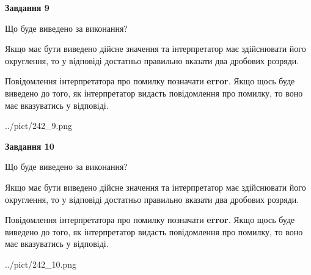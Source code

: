 \documentclass[12pt, ukrainian]{article}
\begin{document}
{\begin {Large}
{\begin {center}\textbf{Завдання 9}\end {center}}\par
Що буде виведено за виконання? \par

Якщо має бути виведено дійсне значення та інтерпретатор має здійснювати його округлення, 
то у відповіді достатньо правильно вказати два дробових розряди.

Повідомлення інтерпретатора про помилку позначати \textbf{error}.
Якщо щось буде виведено до того, як інтерпретатор видасть повідомлення про помилку, 
то воно має вказуватись у відповіді. \par

\begin{center}
	{../pict/242_9.png}
\end{center}
\newpage

{\begin {center}\textbf{Завдання 10}\end {center}}\par
Що буде виведено за виконання? \par

Якщо має бути виведено дійсне значення та інтерпретатор має здійснювати його округлення, 
то у відповіді достатньо правильно вказати два дробових розряди.

Повідомлення інтерпретатора про помилку позначати \textbf{error}.
Якщо щось буде виведено до того, як інтерпретатор видасть повідомлення про помилку, 
то воно має вказуватись у відповіді. \par

\begin{center}
	{../pict/242_10.png}
\end{center}
\newpage

\end {Large}}
\end{document}
